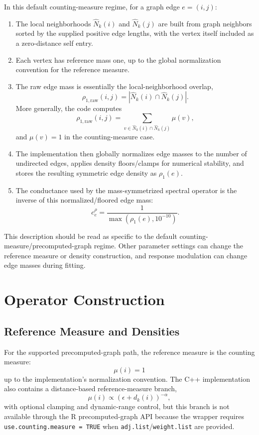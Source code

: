 \documentclass[11pt]{article}
\newcommand{\code}[1]{\texttt{#1}}
\begin{document}
In this default counting-measure regime, for a graph edge \(e=(i,j)\):
\begin{enumerate}[leftmargin=1.5em]
  \item The local neighborhoods \(\widehat N_k(i)\) and \(\widehat N_k(j)\)
  are built from graph neighbors sorted by the supplied positive edge lengths,
  with the vertex itself included as a zero-distance self entry.
  \item Each vertex has reference mass one, up to the global normalization
  convention for the reference measure.
  \item The raw edge mass is essentially the local-neighborhood overlap,
  \[
    \rho_{1,\mathrm{raw}}(i,j)
      =
      \left|\widehat N_k(i)\cap \widehat N_k(j)\right|.
  \]
  More generally, the code computes
  \[
    \rho_{1,\mathrm{raw}}(i,j)
      =
      \sum_{v\in \widehat N_k(i)\cap \widehat N_k(j)} \mu(v),
  \]
  and \(\mu(v)=1\) in the counting-measure case.
  \item The implementation then globally normalizes edge masses to the number
  of undirected edges, applies density floors/clamps for numerical stability,
  and stores the resulting symmetric edge density as \(\rho_1(e)\).
  \item The conductance used by the mass-symmetrized spectral operator is the
  inverse of this normalized/floored edge mass:
  \[
    c_e^\rho
      =
      \frac{1}{\max(\rho_1(e),10^{-10})}.
  \]
\end{enumerate}
This description should be read as specific to the default
counting-measure/precomputed-graph regime. Other parameter settings can change
the reference measure or density construction, and response modulation can
change edge masses during fitting.

\section{Operator Construction}

\subsection{Reference Measure and Densities}

For the supported precomputed-graph path, the reference measure is the counting
measure:
\[
  \mu(i) = 1
\]
up to the implementation's normalization convention. The C++ implementation
also contains a distance-based reference-measure branch,
\[
  \mu(i) \propto (\epsilon + d_k(i))^{-\alpha},
\]
with optional clamping and dynamic-range control, but this branch is not
available through the R precomputed-graph API because the wrapper requires
\code{use.counting.measure = TRUE} when \code{adj.list}/\code{weight.list} are
provided.
\end{document}
